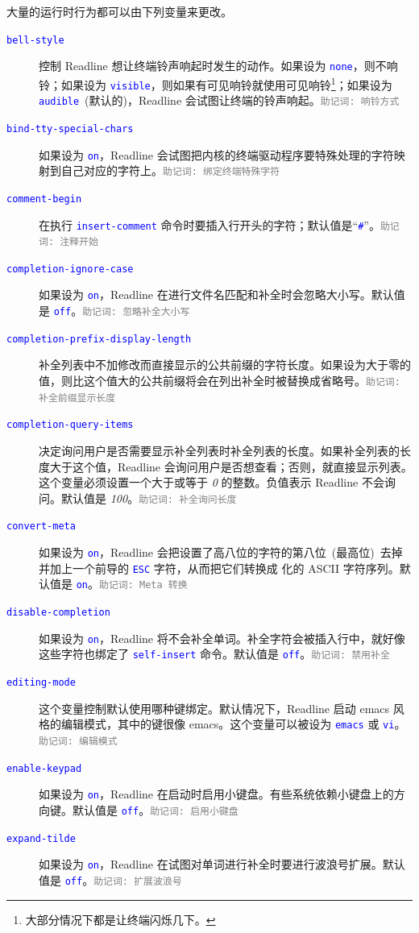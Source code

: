 \documentclass[openany,notitlepage]{book}
\newcommand{\mnemonic}[1]{\textcolor{gray}{{\scriptsize\tt 助记词: #1}}}
\newcommand{\code}[1]{\textcolor{blue}{{\tt #1}}}
\newcommand{\hl}[1]{{\sl #1}}
\begin{document}
\begin{CJK}{UTF8}{song}
大量的运行时行为都可以由下列变量来更改。
\begin{description}
\item[\code{bell-style}] 控制 Readline 想让终端铃声响起时发生的动作。如果设为 \code{none}，则不响铃；如果设为 \code{visible}，则如果有可见响铃就使用可见响铃\footnote{大部分情况下都是让终端闪烁几下。}；如果设为 \code{audible}~(默认的)，Readline 会试图让终端的铃声响起。\mnemonic{响铃方式}
\item[\code{bind-tty-special-chars}] 如果设为 \code{on}，Readline 会试图把内核的终端驱动程序要特殊处理的字符映射到自己对应的字符上。\mnemonic{绑定终端特殊字符}
\item[\code{comment-begin}] 在执行 \code{insert-comment} 命令时要插入行开头的字符；默认值是``\code{\#}''。\mnemonic{注释开始}
\item[\code{completion-ignore-case}] 如果设为 \code{on}，Readline 在进行文件名匹配和补全时会忽略大小写。默认值是 \code{off}。\mnemonic{忽略补全大小写}
\item[\code{completion-prefix-display-length}] 补全列表中不加修改而直接显示的公共前缀的字符长度。如果设为大于零的值，则比这个值大的公共前缀将会在列出补全时被替换成省略号。\mnemonic{补全前缀显示长度}
\item[\code{completion-query-items}] 决定询问用户是否需要显示补全列表时补全列表的长度。如果补全列表的长度大于这个值，Readline 会询问用户是否想查看；否则，就直接显示列表。这个变量必须设置一个大于或等于 \hl{0} 的整数。负值表示 Readline 不会询问。默认值是 \hl{100}。\mnemonic{补全询问长度}
\item[\code{convert-meta}] 如果设为 \code{on}，Readline 会把设置了高八位的字符的第八位~(最高位)~去掉并加上一个前导的 \code{ESC} 字符，从而把它们转换成  化的 ASCII 字符序列。默认值是 \code{on}。\mnemonic{Meta 转换}
\item[\code{disable-completion}] 如果设为 \code{on}，Readline 将不会补全单词。补全字符会被插入行中，就好像这些字符也绑定了 \code{self-insert} 命令。默认值是 \code{off}。\mnemonic{禁用补全}
\item[\code{editing-mode}] 这个变量控制默认使用哪种键绑定。默认情况下，Readline 启动 emacs 风格的编辑模式，其中的键很像 emacs。这个变量可以被设为 \code{emacs} 或 \code{vi}。\mnemonic{编辑模式}
\item[\code{enable-keypad}] 如果设为 \code{on}，Readline 在启动时启用小键盘。有些系统依赖小键盘上的方向键。默认值是 \code{off}。\mnemonic{启用小键盘}
\item[\code{expand-tilde}] 如果设为 \code{on}，Readline 在试图对单词进行补全时要进行波浪号扩展。默认值是 \code{off}。\mnemonic{扩展波浪号}

\end{description}
\end{CJK}
\end{document}
